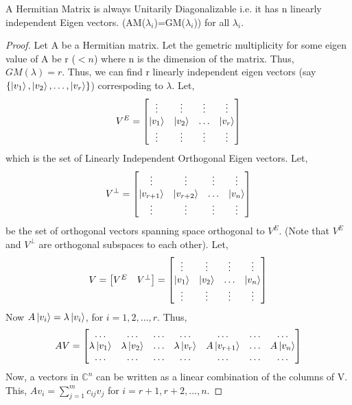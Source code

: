 \begin{theorem}
    A Hermitian Matrix is always Unitarily Diagonalizable i.e. it has n linearly independent Eigen vectors. (AM($\lambda_i$)=GM($\lambda_i$)) for all $\lambda_i$.
\end{theorem}
\begin{proof}
    Let A be a Hermitian matrix. Let the gemetric multiplicity for some eigen value of A be r ($<n$) where n is the dimension of the matrix.
    Thus, $GM(\lambda)=r$. Thus, we can find r linearly independent eigen vectors (say $\{\ket{v_1},\ket{v_2},\ldots,\ket{v_r}\}$) correspoding to $\lambda$.
    Let,
    \[V^E=\begin{bmatrix} \vdots & \vdots & \vdots & \vdots \\ \ket{v_1} & \ket{v_2} & \ldots & \ket{v_r} \\ \vdots & \vdots & \vdots & \vdots \end{bmatrix}\]
    which is the set of Linearly Independent Orthogonal Eigen vectors.
    Let,
    \[ V^{\perp} = \begin{bmatrix} \vdots & \vdots & \vdots & \vdots \\ \ket{v_{r+1}} & \ket{v_{r+2}} & \ldots & \ket{v_n} \\ \vdots & \vdots & \vdots & \vdots \end{bmatrix}\]
    be the set of orthogonal vectors spanning space orthogonal to $V^E$. (Note that $V^E$ and $V^{\perp}$ are orthogonal subspaces to each other).
    Let,
    \[V=\begin{bmatrix} V^E & V^{\perp} \end{bmatrix} = \begin{bmatrix} \vdots & \vdots & \vdots & \vdots \\ \ket{v_1} & \ket{v_2} & \ldots & \ket{v_n} \\ \vdots & \vdots & \vdots & \vdots \end{bmatrix}\]
    Now $A\ket{v_i}=\lambda\ket{v_i}$, for $i=1,2,\ldots,r$. Thus,
    \[ AV=\begin{bmatrix} \ldots & \ldots & \ldots & \ldots & \ldots & \ldots & \ldots \\ \lambda\ket{v_1} & \lambda\ket{v_2} & \ldots & \lambda\ket{v_r} & A\ket{v_{r+1}} & \ldots & A\ket{v_n} \\ \ldots & \ldots & \ldots & \ldots & \ldots  & \ldots & \ldots \end{bmatrix}\]
    Now, a vectors in $\mathbb{C}^n$ can be written as a linear combination of the columns of V. This, $Av_i=\sum_{j=1}^m c_{ij}v_j$ for $i=r+1,r+2,\ldots,n$.

\end{proof}
